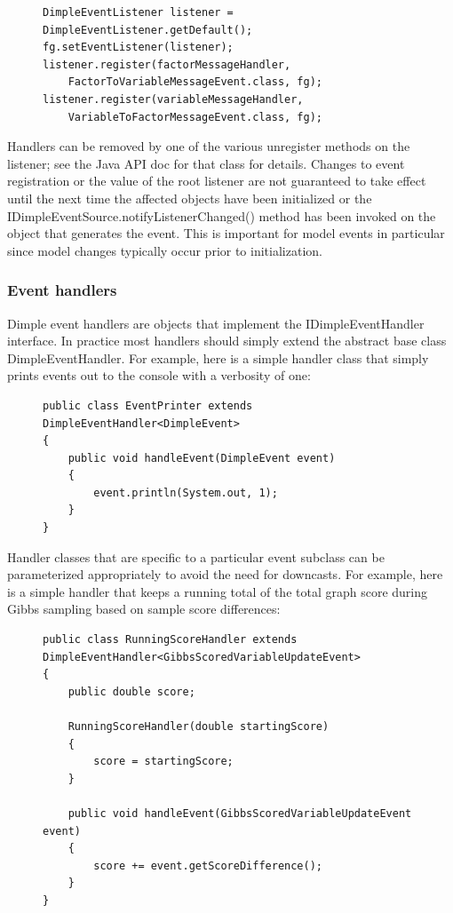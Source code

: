 \begin{figure}[H]
\begin{lstlisting}
DimpleEventListener listener = DimpleEventListener.getDefault();
fg.setEventListener(listener);
listener.register(factorMessageHandler,
    FactorToVariableMessageEvent.class, fg);
listener.register(variableMessageHandler,
    VariableToFactorMessageEvent.class, fg);
\end{lstlisting}
\end{figure}

Handlers can be removed by one of the various unregister methods on the listener; see the Java API doc for that class for details. Changes to event registration or the value of the root listener are not guaranteed to take effect until the next time the affected objects have been initialized or the IDimpleEventSource.notifyListenerChanged() method has been invoked on the object that generates the event. This is important for model events in particular since model changes typically occur prior to initialization. 

\subsubsection{Event handlers}
Dimple event handlers are objects that implement the IDimpleEventHandler interface. In practice most handlers should simply extend the abstract base class DimpleEventHandler. For example, here is a simple handler class that simply prints events out to the console with a verbosity of one: 

\begin{figure}[H]
\begin{lstlisting}
public class EventPrinter extends DimpleEventHandler<DimpleEvent>
{
    public void handleEvent(DimpleEvent event)
    {
        event.println(System.out, 1);
    }
}
\end{lstlisting}
\end{figure}

Handler classes that are specific to a particular event subclass can be parameterized appropriately to avoid the need for downcasts. For example, here is a simple handler that keeps a running total of the total graph score during Gibbs sampling based on sample score differences:

\begin{figure}[H] 
\begin{lstlisting}
public class RunningScoreHandler extends DimpleEventHandler<GibbsScoredVariableUpdateEvent>
{
    public double score;

    RunningScoreHandler(double startingScore)
    {
        score = startingScore;
    }

    public void handleEvent(GibbsScoredVariableUpdateEvent event)
    {
        score += event.getScoreDifference();
    }
}
\end{lstlisting}
\end{figure}

\fi